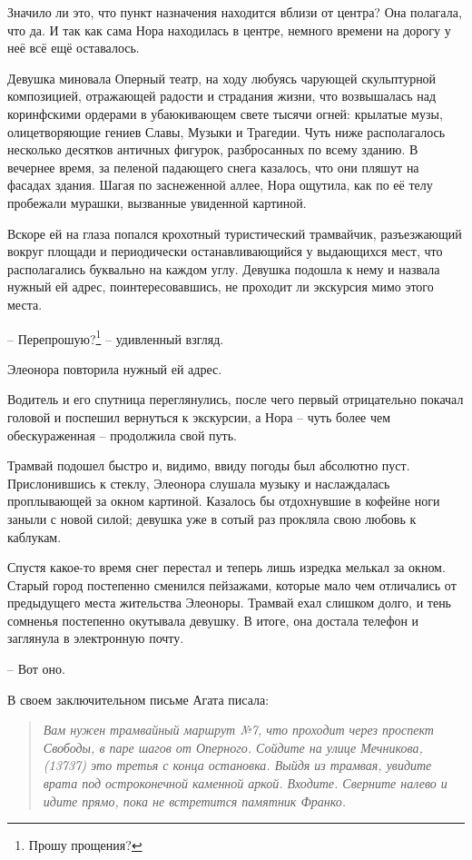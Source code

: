 \documentclass[
  a5paperpaper,
  DIV=11,
  numbers=noendperiod]{scrreprt}
\begin{document}
Значило ли это, что пункт назначения находится вблизи от центра? Она
полагала, что да. И так как сама Нора находилась в центре, немного
времени на дорогу у неё всё ещё оставалось.

Девушка миновала Оперный театр, на ходу любуясь чарующей скульптурной
композицией, отражающей радости и страдания жизни, что возвышалась над
коринфскими ордерами в убаюкивающем свете тысячи огней: крылатые музы,
олицетворяющие гениев Славы, Музыки и Трагедии. Чуть ниже располагалось
несколько десятков античных фигурок, разбросанных по всему зданию. В
вечернее время, за пеленой падающего снега казалось, что они пляшут на
фасадах здания. Шагая по заснеженной аллее, Нора ощутила, как по её телу
пробежали мурашки, вызванные увиденной картиной.

Вскоре ей на глаза попался крохотный туристический трамвайчик,
разъезжающий вокруг площади и периодически останавливающийся у
выдающихся мест, что располагались буквально на каждом углу. Девушка
подошла к нему и назвала нужный ей адрес, поинтересовавшись, не проходит
ли экскурсия мимо этого места.

-- Перепрошую?\footnote{Прошу прощения?} -- удивленный взгляд.

Элеонора повторила нужный ей адрес.

Водитель и его спутница переглянулись, после чего первый отрицательно
покачал головой и поспешил вернуться к экскурсии, а Нора -- чуть более
чем обескураженная -- продолжила свой путь.

Трамвай подошел быстро и, видимо, ввиду погоды был абсолютно пуст.
Прислонившись к стеклу, Элеонора слушала музыку и наслаждалась
проплывающей за окном картиной. Казалось бы отдохнувшие в кофейне ноги
заныли с новой силой; девушка уже в сотый раз прокляла свою любовь к
каблукам.

Спустя какое-то время снег перестал и теперь лишь изредка мелькал за
окном. Старый город постепенно сменился пейзажами, которые мало чем
отличались от предыдущего места жительства Элеоноры. Трамвай ехал
слишком долго, и тень сомненья постепенно окутывала девушку. В итоге,
она достала телефон и заглянула в электронную почту.

-- Вот оно.

В своем заключительном письме Агата писала:

\begin{quote}
\emph{Вам нужен трамвайный маршрут №7, что проходит через проспект
Свободы, в паре шагов от Оперного. Сойдите на улице Мечникова, (13737)
это третья с конца остановка. Выйдя из трамвая, увидите врата под
остроконечной каменной аркой. Входите. Сверните налево и идите прямо,
пока не встретится памятник Франко.}
\end{quote}
\end{document}
